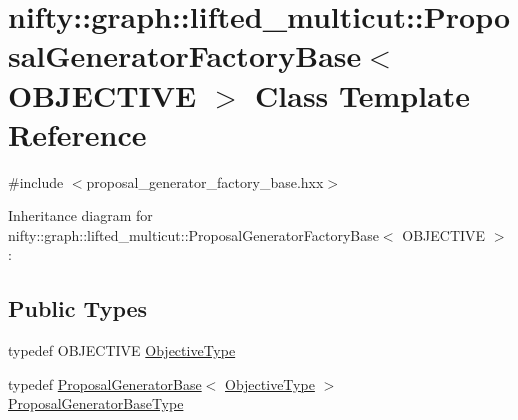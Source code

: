 \hypertarget{classnifty_1_1graph_1_1lifted__multicut_1_1ProposalGeneratorFactoryBase}{}\section{nifty\+:\+:graph\+:\+:lifted\+\_\+multicut\+:\+:Proposal\+Generator\+Factory\+Base$<$ O\+B\+J\+E\+C\+T\+I\+V\+E $>$ Class Template Reference}
\label{classnifty_1_1graph_1_1lifted__multicut_1_1ProposalGeneratorFactoryBase}


{\ttfamily \#include $<$proposal\+\_\+generator\+\_\+factory\+\_\+base.\+hxx$>$}



Inheritance diagram for nifty\+:\+:graph\+:\+:lifted\+\_\+multicut\+:\+:Proposal\+Generator\+Factory\+Base$<$ O\+B\+J\+E\+C\+T\+I\+V\+E $>$\+:
\subsection*{Public Types}
\begin{DoxyCompactItemize}
\item 
typedef O\+B\+J\+E\+C\+T\+I\+V\+E \hyperlink{classnifty_1_1graph_1_1lifted__multicut_1_1ProposalGeneratorFactoryBase_a397bfdd5d71a4be8ff2b8e74eca08866}{Objective\+Type}
\item 
typedef \hyperlink{classnifty_1_1graph_1_1lifted__multicut_1_1ProposalGeneratorBase}{Proposal\+Generator\+Base}$<$ \hyperlink{classnifty_1_1graph_1_1lifted__multicut_1_1ProposalGeneratorFactoryBase_a397bfdd5d71a4be8ff2b8e74eca08866}{Objective\+Type} $>$ \hyperlink{classnifty_1_1graph_1_1lifted__multicut_1_1ProposalGeneratorFactoryBase_a26c563a0dc26559eca515d98ddbc0e8b}{Proposal\+Generator\+Base\+Type}
\end{DoxyCompactItemize}
